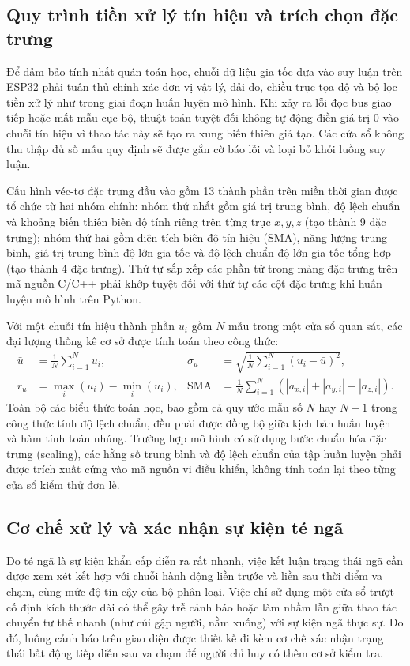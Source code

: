 \subsection{Quy trình tiền xử lý tín hiệu và trích chọn đặc trưng}
Để đảm bảo tính nhất quán toán học, chuỗi dữ liệu gia tốc đưa vào suy luận trên ESP32 phải tuân thủ chính xác đơn vị vật lý, dải đo, chiều trục tọa độ và bộ lọc tiền xử lý như trong giai đoạn huấn luyện mô hình. Khi xảy ra lỗi đọc bus giao tiếp hoặc mất mẫu cục bộ, thuật toán tuyệt đối không tự động điền giá trị 0 vào chuỗi tín hiệu vì thao tác này sẽ tạo ra xung biến thiên giả tạo. Các cửa sổ không thu thập đủ số mẫu quy định sẽ được gắn cờ báo lỗi và loại bỏ khỏi luồng suy luận.

Cấu hình véc-tơ đặc trưng đầu vào gồm 13 thành phần trên miền thời gian được tổ chức từ hai nhóm chính: nhóm thứ nhất gồm giá trị trung bình, độ lệch chuẩn và khoảng biến thiên biên độ tính riêng trên từng trục $x, y, z$ (tạo thành 9 đặc trưng); nhóm thứ hai gồm diện tích biên độ tín hiệu (SMA), năng lượng trung bình, giá trị trung bình độ lớn gia tốc và độ lệch chuẩn độ lớn gia tốc tổng hợp (tạo thành 4 đặc trưng). Thứ tự sắp xếp các phần tử trong mảng đặc trưng trên mã nguồn C/C++ phải khớp tuyệt đối với thứ tự các cột đặc trưng khi huấn luyện mô hình trên Python.

Với một chuỗi tín hiệu thành phần $u_i$ gồm $N$ mẫu trong một cửa sổ quan sát, các đại lượng thống kê cơ sở được tính toán theo công thức:
\begin{align}
\bar u&=\frac{1}{N}\sum_{i=1}^{N}u_i, &
\sigma_u&=\sqrt{\frac{1}{N}\sum_{i=1}^{N}(u_i-\bar u)^2},\\
r_u&=\max_i(u_i)-\min_i(u_i), &
\mathrm{SMA}&=\frac{1}{N}\sum_{i=1}^{N}(|a_{x,i}|+|a_{y,i}|+|a_{z,i}|).
\end{align}
Toàn bộ các biểu thức toán học, bao gồm cả quy ước mẫu số $N$ hay $N-1$ trong công thức tính độ lệch chuẩn, đều phải được đồng bộ giữa kịch bản huấn luyện và hàm tính toán nhúng. Trường hợp mô hình có sử dụng bước chuẩn hóa đặc trưng (scaling), các hằng số trung bình và độ lệch chuẩn của tập huấn luyện phải được trích xuất cứng vào mã nguồn vi điều khiển, không tính toán lại theo từng cửa sổ kiểm thử đơn lẻ.

\subsection{Cơ chế xử lý và xác nhận sự kiện té ngã}
Do té ngã là sự kiện khẩn cấp diễn ra rất nhanh, việc kết luận trạng thái ngã cần được xem xét kết hợp với chuỗi hành động liền trước và liền sau thời điểm va chạm, cùng mức độ tin cậy của bộ phân loại. Việc chỉ sử dụng một cửa sổ trượt cố định kích thước dài có thể gây trễ cảnh báo hoặc làm nhầm lẫn giữa thao tác chuyển tư thế nhanh (như cúi gập người, nằm xuống) với sự kiện ngã thực sự. Do đó, luồng cảnh báo trên giao diện được thiết kế đi kèm cơ chế xác nhận trạng thái bất động tiếp diễn sau va chạm để người chỉ huy có thêm cơ sở kiểm tra.

